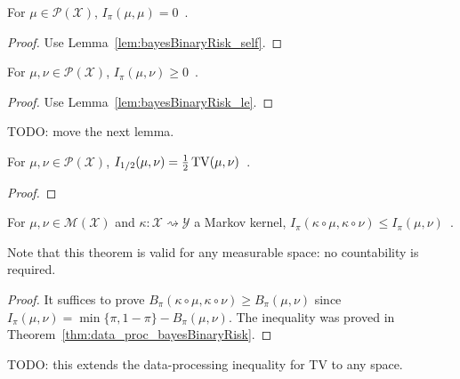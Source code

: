 \begin{lemma}
  \label{lem:deGrootInfo_self}
  For $\mu \in \mathcal P(\mathcal X)$, $I_\pi(\mu, \mu) = 0$~.
\end{lemma}

\begin{proof}%
{}
Use Lemma~\ref{lem:bayesBinaryRisk_self}.
\end{proof}

\begin{lemma}
  \label{lem:deGrootInfo_nonneg}
  For $\mu, \nu \in \mathcal P(\mathcal X)$, $I_\pi(\mu, \nu) \ge 0$~.
\end{lemma}

\begin{proof}%
{}
Use Lemma~\ref{lem:bayesBinaryRisk_le}.
\end{proof}

TODO: move the next lemma.
\begin{lemma}
  \label{lem:deGrootInfo_half}
  For $\mu, \nu \in \mathcal P(\mathcal X)$, $I_{1/2}(\mu, \nu) = \frac{1}{2}\operatorname{TV}(\mu, \nu)$~.
\end{lemma}

\begin{proof}%
\uses{}

\end{proof}

\begin{theorem}
  \label{thm:data_proc_deGrootInfo}
  For $\mu, \nu \in \mathcal M(\mathcal X)$ and $\kappa : \mathcal X \rightsquigarrow \mathcal Y$ a Markov kernel, $I_\pi(\kappa \circ \mu, \kappa \circ \nu) \le I_\pi(\mu, \nu)$~.
\end{theorem}

Note that this theorem is valid for any measurable space: no countability is required.

\begin{proof}%
{}
It suffices to prove $B_\pi(\kappa \circ \mu, \kappa \circ \nu) \ge B_\pi(\mu, \nu)$ since $I_\pi(\mu, \nu) = \min\{\pi, 1 - \pi\} - B_\pi(\mu, \nu)$.
The inequality was proved in Theorem~\ref{thm:data_proc_bayesBinaryRisk}.
\end{proof}

TODO: this extends the data-processing inequality for TV to any space.

